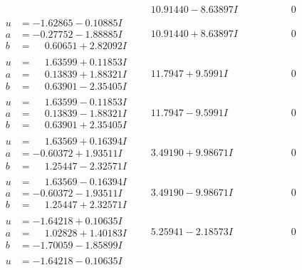 \documentclass[1p]{elsarticle_modified}
\theoremstyle{definition}
\begin{document}
$$\begin{array}{c|c|c}
 & \phantom{-}10.91440 - 8.63897 I & \phantom{-0.000000 } 0 \\ \hline\begin{aligned}
u &= -1.62865 - 0.10885 I \\
a &= -0.27752 - 1.88885 I \\
b &= \phantom{-}0.60651 + 2.82092 I\end{aligned}
 & \phantom{-}10.91440 + 8.63897 I & \phantom{-0.000000 } 0 \\ \hline\begin{aligned}
u &= \phantom{-}1.63599 + 0.11853 I \\
a &= \phantom{-}0.13839 + 1.88321 I \\
b &= \phantom{-}0.63901 - 2.35405 I\end{aligned}
 & \phantom{-}11.7947 + 9.5991 I & \phantom{-0.000000 } 0 \\ \hline\begin{aligned}
u &= \phantom{-}1.63599 - 0.11853 I \\
a &= \phantom{-}0.13839 - 1.88321 I \\
b &= \phantom{-}0.63901 + 2.35405 I\end{aligned}
 & \phantom{-}11.7947 - 9.5991 I & \phantom{-0.000000 } 0 \\ \hline\begin{aligned}
u &= \phantom{-}1.63569 + 0.16394 I \\
a &= -0.60372 + 1.93511 I \\
b &= \phantom{-}1.25447 - 2.32571 I\end{aligned}
 & \phantom{-}3.49190 + 9.98671 I & \phantom{-0.000000 } 0 \\ \hline\begin{aligned}
u &= \phantom{-}1.63569 - 0.16394 I \\
a &= -0.60372 - 1.93511 I \\
b &= \phantom{-}1.25447 + 2.32571 I\end{aligned}
 & \phantom{-}3.49190 - 9.98671 I & \phantom{-0.000000 } 0 \\ \hline\begin{aligned}
u &= -1.64218 + 0.10635 I \\
a &= \phantom{-}1.02828 + 1.40183 I \\
b &= -1.70059 - 1.85899 I\end{aligned}
 & \phantom{-}5.25941 - 2.18573 I & \phantom{-0.000000 } 0 \\ \hline\begin{aligned}
u &= -1.64218 - 0.10635 I \\

\end{aligned}
\end{array}$$
\end{document}
